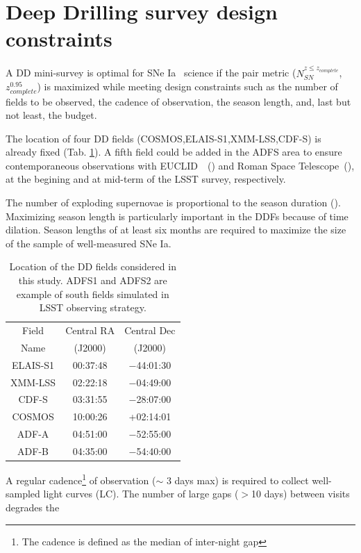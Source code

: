 \documentclass[\docopts]{\docclass}
\newcommand{\cosmos}{{\sc COSMOS}}
\newcommand{\elais}{{\sc ELAIS-S1}}
\newcommand{\xmm}{{\sc XMM-LSS}}
\newcommand{\cdfs}{{\sc CDF-S}}
\newcommand{\adfa}{{\sc ADF-A}}
\newcommand{\adfb}{{\sc ADF-B}}
\newcommand{\euclid}{{\sc EUCLID}}
\newcommand{\romanspace}{{\sc Roman Space Telescope}}
\newcommand{\sne}{{SNe Ia}}
\newcommand{\nsncomp}{{$N_{SN}^{z\leq z_{complete}}$}}
\newcommand{\zcompb}{\mbox{$z_{complete}^{0.95}$}}
\begin{document}
\section{Deep Drilling survey design constraints}
\label{sec:design}
A DD mini-survey is optimal for \sne~ science if the pair metric (\nsncomp,\zcompb) is maximized while meeting design constraints such as the number of fields to be observed, the cadence of observation, the season length, and, last but not least, the budget.
\par
The location of four DD fields (\cosmos,\elais,\xmm,\cdfs) is already fixed (Tab. \ref{tab:locddf}). A fifth field could be added in the ADFS area to ensure contemporaneous observations with \euclid~~(\citealt{laureijs2011euclid,Amendola_2013}) and \romanspace~(\citealt{spergel2015widefield}), at the begining and at mid-term of the LSST survey, respectively.
\par
The number of exploding supernovae is proportional to the season duration (\citealt{perrett}). Maximizing season length is particularly important in the DDFs because of time dilation. Season lengths of at least six months are required to maximize the size of the sample of well-measured \sne.
\begin{table}[!htbp]
  \caption{Location of the DD fields considered in this study. ADFS1 and ADFS2 are example of south fields simulated in LSST observing strategy.}\label{tab:locddf}
  \begin{center}
    \begin{tabular}{c|c|c}
      \hline
      \hline
      Field & Central RA & Central Dec\\ 
      Name & (J2000)  & (J2000)\\
      \hline
     \elais & 00:37:48 & −44:01:30 \\
     \xmm & 02:22:18 &  −04:49:00 \\
     \cdfs & 03:31:55 & −28:07:00 \\
     \cosmos &10:00:26 & +02:14:01 \\
     \hline 
     \adfa & 04:51:00& −52:55:00 \\
     \adfb & 04:35:00 & −54:40:00 \\
      \hline
      \hline
      \end{tabular}
  \end{center}
\end{table}
\par
A regular cadence\footnote{The cadence is defined as the median of inter-night gap} of observation ($\sim$ 3 days max) is required to collect well-sampled light curves (LC). The number of large gaps ($>$10 days) between visits degrades the 
\end{document}
